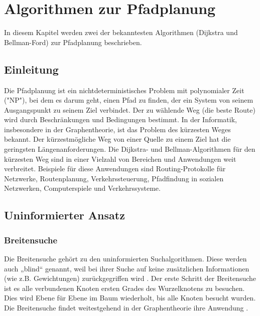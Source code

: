\chapter{Algorithmen zur Pfadplanung}
In diesem Kapitel werden zwei der bekanntesten Algorithmen (Dijkstra und Bellman-Ford) zur Pfadplanung beschrieben.

\section{Einleitung}
\label{Was ist Pfadplanung?}
Die Pfadplanung ist ein nichtdeterministisches Problem mit polynomialer Zeit ("NP"), bei dem es darum geht, einen Pfad zu finden, der ein System von seinem Ausgangspunkt zu seinem Ziel verbindet. Der zu wählende Weg (die beste Route) wird durch Beschränkungen und Bedingungen bestimmt\cite{Karur:21}.
\newline
\newline
In der Informatik, insbesondere in der Graphentheorie, ist das Problem des kürzesten Weges bekannt. Der kürzestmögliche Weg von einer Quelle zu einem Ziel hat die geringsten Längenanforderungen.
\newline
\newline
Die Dijkstra- und Bellman-Algorithmen für den kürzesten Weg sind in einer Vielzahl von Bereichen und Anwendungen weit verbreitet. Beispiele für diese Anwendungen sind Routing-Protokolle für Netzwerke, Routenplanung, Verkehrssteuerung, Pfadfindung in sozialen Netzwerken, Computerspiele und Verkehrssysteme\cite{Panda:18}.

\section{Uninformierter Ansatz}
\label{Uninformierter Ansatz}
\subsection{Breitensuche}
\label{Breitensuche}
Die Breitensuche gehört zu den uninformierten Suchalgorithmen. Diese werden auch „blind“ genannt, weil bei ihrer 
Suche auf keine zusätzlichen Informationen (wie z.B. Gewichtungen) zurückgegriffen wird \cite[81]{Russell:10}.
Der erste Schritt der Breitensuche ist es alle verbundenen Knoten ersten Grades des Wurzelknotens zu besuchen.
Dies wird Ebene für Ebene im Baum wiederholt, bis alle Knoten besucht wurden. 
Die Breitensuche findet weitestgehend in der Graphentheorie ihre Anwendung \cite[81]{Russell:10}.
\\
\\
\\
\\
